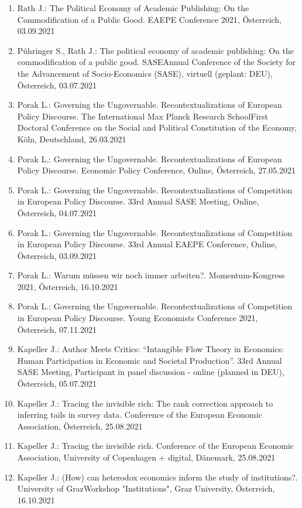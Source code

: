 \begin{enumerate}
	\item Rath J.: The Political Economy of Academic Publishing: On the Commodification of a Public Good. EAEPE Conference 2021, Österreich, 03.09.2021
	\item Pühringer S., Rath J.: The political economy of academic publishing: On the commodification of a public good. SASEAnnual Conference of the Society for the Advancement of Socio-Economics (SASE), virtuell (geplant: DEU), Österreich, 03.07.2021
	\item Porak L.: Governing the Ungovernable. Recontextualizations of European Policy Discourse. The International Max Planck Research SchoolFirst Doctoral Conference on the Social and Political Constitution of the Economy, Köln, Deutschland, 26.03.2021
	\item Porak L.: Governing the Ungovernable. Recontextualizations of European Policy Discourse. Economic Policy Conference, Online, Österreich, 27.05.2021
	\item Porak L.: Governing the Ungovernable. Recontextualizations of Competition in European Policy Discourse. 33rd Annual SASE Meeting, Online, Österreich, 04.07.2021
	\item Porak L.: Governing the Ungovernable. Recontextualizations of Competition in European Policy Discourse. 33rd Annual EAEPE Conference, Online, Österreich, 03.09.2021
	\item Porak L.: Warum müssen wir noch immer arbeiten?. Momentum-Kongress 2021, Österreich, 16.10.2021
	\item Porak L.: Governing the Ungovernable. Recontextualizations of Competition in European Policy Discourse. Young Economists Conference 2021, Österreich, 07.11.2021
	\item Kapeller J.: Author Meets Critics: “Intangible Flow Theory in Economics: Human Participation in Economic and Societal Production”. 33rd Annual SASE Meeting, Participant in panel discussion - online (planned in DEU), Österreich, 05.07.2021
	\item Kapeller J.: Tracing the invisible rich: The rank correction approach to inferring tails in survey data. Conference of the European Economic Association, Österreich, 25.08.2021
	\item Kapeller J.: Tracing the invisible rich. Conference of the European Economic Association, University of Copenhagen + digital, Dänemark, 25.08.2021
	\item Kapeller J.: (How) can heterodox economics inform the study of institutions?. University of GrazWorkshop "Institutions", Graz University, Österreich, 16.10.2021

\end{enumerate}
